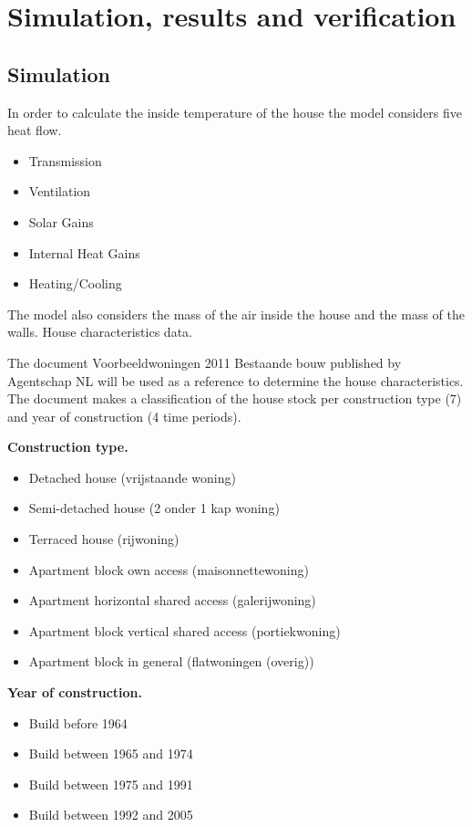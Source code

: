 \section{Simulation, results and verification}

\subsection{Simulation}
In order to calculate the inside temperature of the house the model considers five heat flow. 

\begin{itemize}
    \item Transmission
    \item Ventilation
    \item Solar Gains
    \item Internal Heat Gains
    \item Heating/Cooling
\end{itemize}

The model also considers the mass of the air inside the house and the mass of the walls.  
House characteristics data.

The document Voorbeeldwoningen 2011 Bestaande bouw published by Agentschap NL \cite{VOORBEELD} will be used as a reference to determine the house characteristics. The document makes a classification of the house stock per construction type (7) and year of construction (4 time periods).  

\textbf{Construction type.}
\begin{itemize}
    \item Detached house (vrijstaande woning)
    \item Semi-detached house (2 onder 1 kap woning)
    \item Terraced house (rijwoning)
    \item Apartment block own access (maisonnettewoning)
    \item Apartment horizontal shared access (galerijwoning)
    \item Apartment block vertical shared access (portiekwoning)
    \item Apartment block in general (flatwoningen (overig))
    
\end{itemize}
\textbf{Year of construction.}
\begin{itemize}
    \item Build before 1964
    \item Build between 1965 and 1974
    \item Build between 1975 and 1991
    \item 	Build between 1992 and 2005
\end{itemize}

